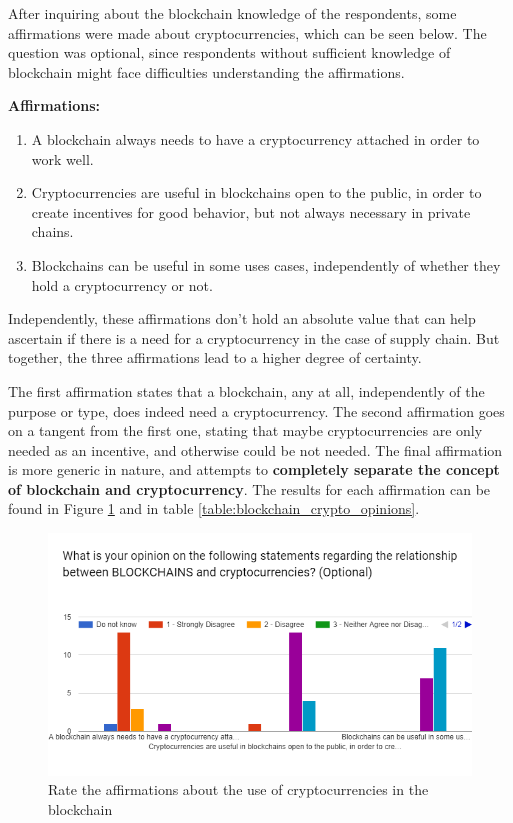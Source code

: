 After inquiring about the blockchain knowledge of the respondents, some affirmations were made about cryptocurrencies, which can be seen below. The question was optional, since respondents without sufficient knowledge of blockchain might face difficulties understanding the affirmations.


\textbf{Affirmations: }
\begin{enumerate}
\item A blockchain always needs to have a cryptocurrency attached in order to work well.
\item Cryptocurrencies are useful in blockchains open to the public, in order to create incentives for good behavior, but not always necessary in private chains.
\item Blockchains can be useful in some uses cases, independently of whether they hold a cryptocurrency or not.
\end{enumerate}

Independently, these affirmations don't hold an absolute value that can help ascertain if there is a need for a cryptocurrency in the case of supply chain. But together, the three affirmations lead to a higher degree of certainty.

The first affirmation states that a blockchain, any at all, independently of the purpose or type, does indeed need a cryptocurrency. The second affirmation goes on a tangent from the first one, stating that maybe cryptocurrencies are only needed as an incentive, and otherwise could be not needed. The final affirmation is more generic in nature, and attempts to \textbf{completely separate the concept of blockchain and cryptocurrency}. The results for each affirmation can be found in Figure \ref{fig:blockchain_crypto_opinions} and in table \ref{table:blockchain_crypto_opinions}.

\begin{figure}[h]
\centering
\includegraphics[scale=0.60]{media/blockchain_crypto_opinions.png}
\caption[Rate the affirmations about the use of cryptocurrencies in the blockchain]{Rate the affirmations about the use of cryptocurrencies in the blockchain}
\label{fig:blockchain_crypto_opinions}
\end{figure}

